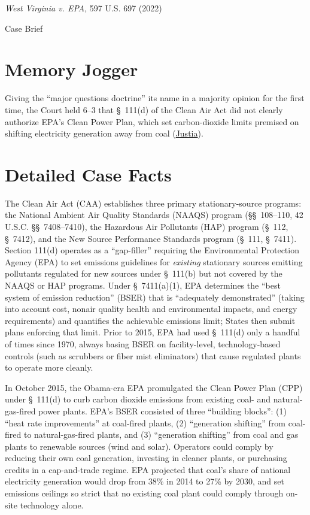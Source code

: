 \documentclass[12pt]{article}
\begin{document}
\begin{center}
{\LARGE \textit{West Virginia v. EPA}, 597 U.S. 697 (2022)\par}
\vspace{0.8em}
{\large Case Brief\par}
\end{center}
\vspace{1em}

\section{Memory Jogger}
Giving the ``major questions doctrine'' its name in a majority opinion for the first time, the Court held 6--3 that \S~111(d) of the Clean Air Act did not clearly authorize EPA's Clean Power Plan, which set carbon-dioxide limits premised on shifting electricity generation away from coal (\href{https://supreme.justia.com/cases/federal/us/597/20-1530/}{Justia}).

\section{Detailed Case Facts}
The Clean Air Act (CAA) establishes three primary stationary-source programs: the National Ambient Air Quality Standards (NAAQS) program (\S\S~108--110, 42 U.S.C. \S\S~7408--7410), the Hazardous Air Pollutants (HAP) program (\S~112, \S~7412), and the New Source Performance Standards program (\S~111, \S~7411). Section 111(d) operates as a ``gap-filler'' requiring the Environmental Protection Agency (EPA) to set emissions guidelines for \textit{existing} stationary sources emitting pollutants regulated for new sources under \S~111(b) but not covered by the NAAQS or HAP programs. Under \S~7411(a)(1), EPA determines the ``best system of emission reduction'' (BSER) that is ``adequately demonstrated'' (taking into account cost, nonair quality health and environmental impacts, and energy requirements) and quantifies the achievable emissions limit; States then submit plans enforcing that limit. Prior to 2015, EPA had used \S~111(d) only a handful of times since 1970, always basing BSER on facility-level, technology-based controls (such as scrubbers or fiber mist eliminators) that cause regulated plants to operate more cleanly.

In October 2015, the Obama-era EPA promulgated the Clean Power Plan (CPP) under \S~111(d) to curb carbon dioxide emissions from existing coal- and natural-gas-fired power plants. EPA's BSER consisted of three ``building blocks'': (1) ``heat rate improvements'' at coal-fired plants, (2) ``generation shifting'' from coal-fired to natural-gas-fired plants, and (3) ``generation shifting'' from coal and gas plants to renewable sources (wind and solar). Operators could comply by reducing their own coal generation, investing in cleaner plants, or purchasing credits in a cap-and-trade regime. EPA projected that coal's share of national electricity generation would drop from 38\% in 2014 to 27\% by 2030, and set emissions ceilings so strict that no existing coal plant could comply through on-site technology alone.
\end{document}
